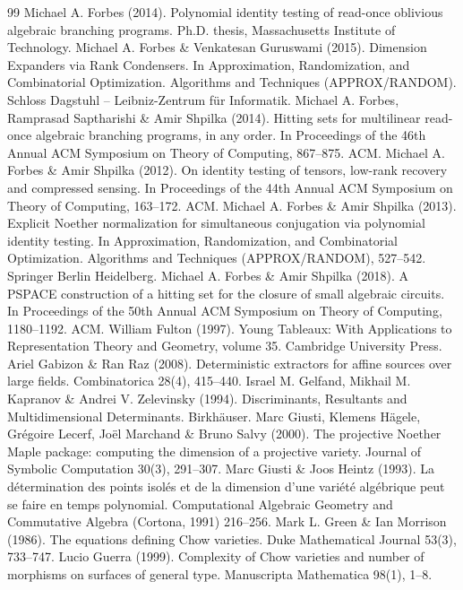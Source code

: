 \documentclass[10pt,a4paper]{article}
\begin{document}
\begin{thebibliography}{99}
 Michael A. Forbes (2014). Polynomial identity testing of read-once oblivious algebraic branching programs. Ph.D. thesis, Massachusetts Institute of Technology.
 Michael A. Forbes \& Venkatesan Guruswami (2015). Dimension Expanders via Rank Condensers. In Approximation, Randomization, and Combinatorial Optimization. Algorithms and Techniques (APPROX/RANDOM). Schloss Dagstuhl – Leibniz-Zentrum für Informatik.
 Michael A. Forbes, Ramprasad Saptharishi \& Amir Shpilka (2014). Hitting sets for multilinear read-once algebraic branching programs, in any order. In Proceedings of the 46th Annual ACM Symposium on Theory of Computing, 867–875. ACM.
 Michael A. Forbes \& Amir Shpilka (2012). On identity testing of tensors, low-rank recovery and compressed sensing. In Proceedings of the 44th Annual ACM Symposium on Theory of Computing, 163–172. ACM.
 Michael A. Forbes \& Amir Shpilka (2013). Explicit Noether normalization for simultaneous conjugation via polynomial identity testing. In Approximation, Randomization, and Combinatorial Optimization. Algorithms and Techniques (APPROX/RANDOM), 527–542. Springer Berlin Heidelberg.
 Michael A. Forbes \& Amir Shpilka (2018). A PSPACE construction of a hitting set for the closure of small algebraic circuits. In Proceedings of the 50th Annual ACM Symposium on Theory of Computing, 1180–1192. ACM.
 William Fulton (1997). Young Tableaux: With Applications to Representation Theory and Geometry, volume 35. Cambridge University Press.
 Ariel Gabizon \& Ran Raz (2008). Deterministic extractors for affine sources over large fields. Combinatorica 28(4), 415–440.
 Israel M. Gelfand, Mikhail M. Kapranov \& Andrei V. Zelevinsky (1994). Discriminants, Resultants and Multidimensional Determinants. Birkhäuser.
 Marc Giusti, Klemens Hägele, Grégoire Lecerf, Joël Marchand \& Bruno Salvy (2000). The projective Noether Maple package: computing the dimension of a projective variety. Journal of Symbolic Computation 30(3), 291–307.
 Marc Giusti \& Joos Heintz (1993). La détermination des points isolés et de la dimension d’une variété algébrique peut se faire en temps polynomial. Computational Algebraic Geometry and Commutative Algebra (Cortona, 1991) 216–256.
 Mark L. Green \& Ian Morrison (1986). The equations defining Chow varieties. Duke Mathematical Journal 53(3), 733–747.
 Lucio Guerra (1999). Complexity of Chow varieties and number of morphisms on surfaces of general type. Manuscripta Mathematica 98(1), 1–8.

\end{thebibliography}
\end{document}
